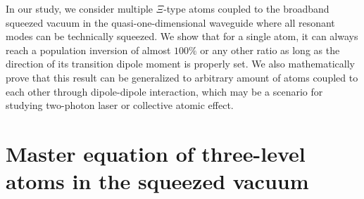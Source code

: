 \documentclass[aps,showpacs,twocolumn,twoside,groupedaddress]{revtex4}
\begin{document}
In our study, we consider multiple $\Xi$-type atoms coupled to the broadband squeezed vacuum in the quasi-one-dimensional waveguide where all resonant modes can be technically squeezed. We show that for a single atom, it can always reach a population inversion of almost $100\%$ or any other ratio as long as the direction of its transition dipole moment is properly set. We also mathematically prove that this result can be generalized to arbitrary amount of atoms coupled to each other through dipole-dipole interaction, which may be a scenario for studying two-photon laser or collective atomic effect.

\section{Master equation of three-level atoms in the squeezed vacuum}
\end{document}
